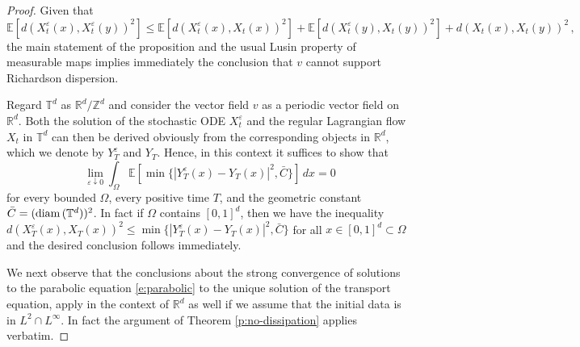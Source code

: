 \documentclass[11pt,reqno]{amsart}
\theoremstyle{definition}
\numberwithin{equation}{section}
\begin{document}
\begin{proof} Given that 
\[
{\mathbb E} [ d (X^\varepsilon_t (x), X_t^\varepsilon (y))^2]
\leq {\mathbb E} [ d (X^\varepsilon_t (x), X_t (x))^2] + {\mathbb E} [ d (X^\varepsilon_t (y), X_t (y))^2]
+ d (X_t (x), X_t (y))^2\, ,
\]
the main statement of the proposition and the usual Lusin property of measurable maps implies immediately the conclusion that $v$ cannot support Richardson dispersion.

Regard $\mathbb T^d$ as $\mathbb R^d/\mathbb Z^d$ and consider the vector field $v$ as a periodic vector field on $\mathbb R^d$. Both the solution of the stochastic ODE $X^\varepsilon_t$ and the regular Lagrangian flow $X_t$ in $\mathbb T^d$ can then be derived obviously from the corresponding objects in $\mathbb R^d$, which we denote by $Y_T^\varepsilon$ and $Y_T$. Hence, in this context it suffices to show that 
\begin{equation}\label{e:target}
\lim_{\varepsilon\downarrow 0} \int_{\Omega} {\mathbb E} [\min\{ |Y_T^\varepsilon (x) - Y_T (x)|^2, \bar C\}]
\, dx = 0
\end{equation}
for every bounded $\Omega$, every positive time $T$, and the geometric constant $\bar C = ({\rm diam}\, (\mathbb T^d))^2$. In fact if $\Omega$ contains $[0,1]^d$, then we have the inequality $d (X_T^\varepsilon (x), X_T (x))^2 \leq \min \{ |Y_T^\varepsilon (x) - Y_T (x)|^2, \bar C\}$ for all $x\in [0,1]^d \subset \Omega$ and the desired conclusion follows immediately.

\medskip

We next observe that the conclusions about the strong convergence of solutions to the parabolic equation \eqref{e:parabolic} to the unique solution of the transport equation, apply in the context of $\mathbb R^d$ as well if we assume that the initial data is in $L^2\cap L^\infty$. In fact the argument of Theorem \ref{p:no-dissipation} applies verbatim. 

\medskip


\end{proof}
\end{document}
